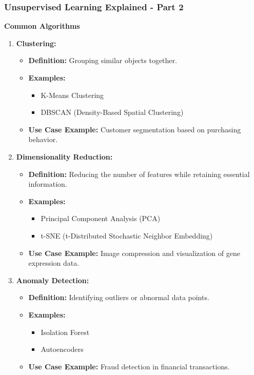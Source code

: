 \documentclass[aspectratio=169]{beamer}
\begin{document}
\begin{frame}[fragile]
    \frametitle{Unsupervised Learning Explained - Part 2}
    \textbf{Common Algorithms} \\
    \begin{enumerate}
        \item \textbf{Clustering:}
            \begin{itemize}
                \item \textbf{Definition:} Grouping similar objects together.
                \item \textbf{Examples:}
                    \begin{itemize}
                        \item K-Means Clustering
                        \item DBSCAN (Density-Based Spatial Clustering)
                    \end{itemize}
                \item \textbf{Use Case Example:} Customer segmentation based on purchasing behavior.
            \end{itemize}
        
        \item \textbf{Dimensionality Reduction:}
            \begin{itemize}
                \item \textbf{Definition:} Reducing the number of features while retaining essential information.
                \item \textbf{Examples:}
                    \begin{itemize}
                        \item Principal Component Analysis (PCA)
                        \item t-SNE (t-Distributed Stochastic Neighbor Embedding)
                    \end{itemize}
                \item \textbf{Use Case Example:} Image compression and visualization of gene expression data.
            \end{itemize}
        
        \item \textbf{Anomaly Detection:}
            \begin{itemize}
                \item \textbf{Definition:} Identifying outliers or abnormal data points.
                \item \textbf{Examples:}
                    \begin{itemize}
                        \item Isolation Forest
                        \item Autoencoders
                    \end{itemize}
                \item \textbf{Use Case Example:} Fraud detection in financial transactions.
            \end{itemize}
    \end{enumerate}
\end{frame}
\end{document}
